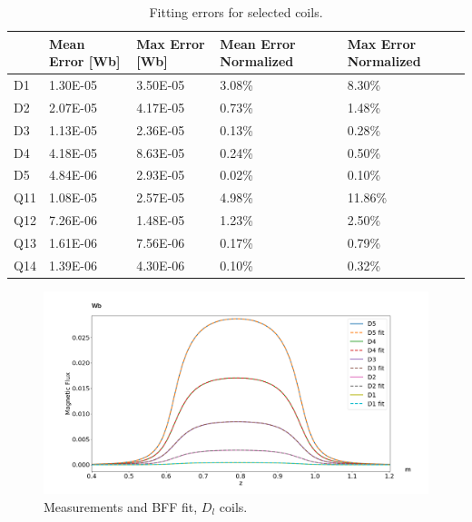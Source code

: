 \begin{table}[!h]
    \centering
    \begin{tabular}{l p{2cm} p{2cm} p{2cm} p{2cm}}
            & Mean Error {[}Wb{]} & Max Error {[}Wb{]} & Mean Error Normalized & Max Error Normalized \\ \hline
        D1  & 1.30E-05            & 3.50E-05           & 3.08\%                & 8.30\%               \\
        D2  & 2.07E-05            & 4.17E-05           & 0.73\%                & 1.48\%               \\
        D3  & 1.13E-05            & 2.36E-05           & 0.13\%                & 0.28\%               \\
        D4  & 4.18E-05            & 8.63E-05           & 0.24\%                & 0.50\%               \\
        D5  & 4.84E-06            & 2.93E-05           & 0.02\%                & 0.10\%               \\
        Q11 & 1.08E-05            & 2.57E-05           & 4.98\%                & 11.86\%              \\
        Q12 & 7.26E-06            & 1.48E-05           & 1.23\%                & 2.50\%               \\
        Q13 & 1.61E-06            & 7.56E-06           & 0.17\%                & 0.79\%               \\
        Q14 & 1.39E-06            & 4.30E-06           & 0.10\%                & 0.32\%
    \end{tabular}
    \caption{Fitting errors for selected coils.}
    \label{tab:fitting-errors}
\end{table}

\begin{figure}[!h]
    \centering
    \includegraphics[width=\linewidth]{figs/Dfit}
    \caption{Measurements and BFF fit, $D_l$ coils.}
    \label{fig:Dfit}
\end{figure}


